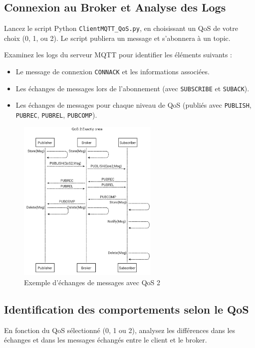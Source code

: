 \documentclass{article}
\begin{document}
\subsection{Connexion au Broker et Analyse des Logs}

Lancez le script Python \texttt{ClientMQTT\_QoS.py}, en choisissant un QoS de votre choix (0, 1, ou 2). Le script publiera un message et s'abonnera à un topic. 

Examinez les logs du serveur MQTT pour identifier les éléments suivants :

\begin{itemize}
    \item Le message de connexion \texttt{CONNACK} et les informations associées.
    \item Les échanges de messages lors de l'abonnement (avec \texttt{SUBSCRIBE} et \texttt{SUBACK}).
    \item Les échanges de messages pour chaque niveau de QoS (publiés avec \texttt{PUBLISH}, \texttt{PUBREC}, \texttt{PUBREL}, \texttt{PUBCOMP}).
\end{itemize}

\begin{figure}[H]
    \centering
    \includegraphics[width=0.6\textwidth]{Images/QoS2.png}
    \caption{Exemple d'échanges de messages avec QoS 2}
\end{figure}

\subsection{Identification des comportements selon le QoS}

En fonction du QoS sélectionné (0, 1 ou 2), analysez les différences dans les échanges et dans les messages échangés entre le client et le broker.
\end{document}

